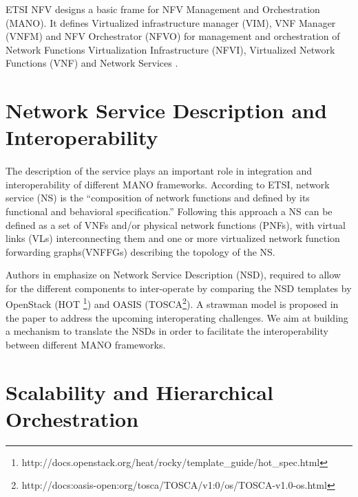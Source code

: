 ETSI NFV designs a basic frame for NFV Management and Orchestration (MANO). It defines Virtualized infrastructure manager (VIM), VNF Manager (VNFM) and NFV Orchestrator (NFVO) for management and orchestration of Network Functions Virtualization Infrastructure (NFVI), Virtualized Network Functions (VNF) and Network Services \cite{etsi2014gs}.

\cite{rotsos_network_2017}
\cite{de_sousa_network_2018}
\cite{yong_li_software-defined_2015}

\section{Network Service Description and Interoperability}
\label{serviceDescription}
\paragraph{}
The description of the service plays an important role in integration and interoperability of different MANO frameworks. According to ETSI, network service (NS) is the “composition of network functions and defined by its functional and behavioral specification.” Following this approach a NS can be defined as a set of VNFs and/or physical network functions (PNFs), with virtual links (VLs) interconnecting them and one or more virtualized network function forwarding graphs(VNFFGs) describing the topology of the NS.

Authors in \cite{garay_service_2016} emphasize on Network Service Description (NSD), required to allow for the different components to inter-operate by comparing the NSD templates by OpenStack (HOT \footnote{http://docs.openstack.org/heat/rocky/template\_guide/hot\_spec.html}) and OASIS (TOSCA\footnote{http://docs:oasis-open:org/tosca/TOSCA/v1:0/os/TOSCA-v1.0-os.html}). A strawman model is proposed in the paper to address the upcoming interoperating challenges. We aim at building a mechanism to translate the NSDs in order to facilitate the interoperability between different MANO frameworks.




\section{Scalability and Hierarchical Orchestration}
\label{manoscale}

